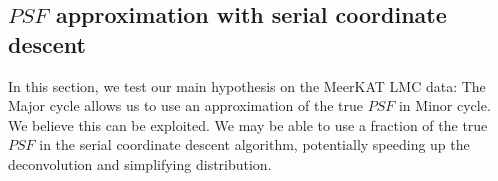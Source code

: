 


\subsection{$PSF$ approximation with serial coordinate descent} \label{results:gradients}
In this section, we test our main hypothesis on the MeerKAT LMC data: The Major cycle allows us to use an approximation of the true $PSF$ in Minor cycle. We believe this can be exploited. We may be able to use a fraction of the true $PSF$ in the serial coordinate descent algorithm, potentially speeding up the deconvolution and simplifying distribution.

